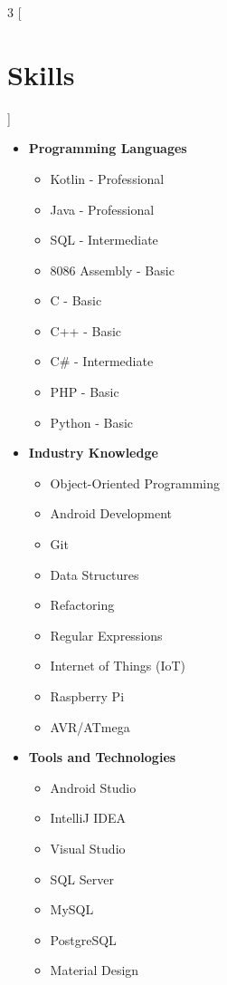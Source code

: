 \begin{multicols}{3}
[\section*{\LARGE{Skills}}]
    \begin{itemize}
        \item \textbf{Programming Languages}
        \begin{itemize}
            \item Kotlin - Professional
            \item Java - Professional
            \item SQL - Intermediate
            \item 8086 Assembly - Basic
            \item C - Basic
            \item C++ - Basic
            \item C\# - Intermediate
            \item PHP - Basic
            \item Python - Basic
        \end{itemize}
        \item \textbf{Industry Knowledge}
        \begin{itemize}
            \item Object-Oriented Programming
            \item Android Development
            \item Git
            \item Data Structures
            \item Refactoring
            \item Regular Expressions
            \item Internet of Things (IoT)
            \item Raspberry Pi
            \item AVR/ATmega
        \end{itemize}
        \item \textbf{Tools and Technologies}
        \begin{itemize}
            \item Android Studio
            \item IntelliJ IDEA
            \item Visual Studio
            \item SQL Server
            \item MySQL
            \item PostgreSQL
            \item Material Design
        \end{itemize}
    \end{itemize}
\end{multicols}